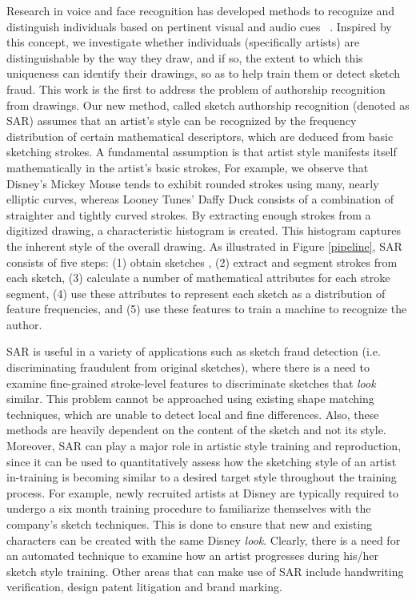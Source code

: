 Research in voice and face recognition has developed methods to recognize and distinguish individuals based on pertinent visual and audio cues ~\cite{tolba2006face}. Inspired by this concept, we investigate whether individuals (specifically artists) are distinguishable by the way they draw, and if so, the extent to which this uniqueness can identify their drawings, so as to help train them or detect sketch fraud. This work is the first to address the problem of authorship recognition from drawings. Our new method, called sketch authorship recognition (denoted as SAR) assumes that an artist's style can be recognized by the frequency distribution of certain mathematical descriptors, which are deduced from basic sketching strokes. A fundamental assumption is that artist style manifests itself mathematically in the artist's basic strokes, For example, we observe that Disney's Mickey Mouse tends to exhibit rounded strokes using many, nearly elliptic curves, whereas Looney Tunes' Daffy Duck consists of a combination of straighter and tightly curved strokes. By extracting enough strokes from a digitized drawing, a characteristic histogram is created. This histogram captures the inherent style of the overall drawing. As illustrated in Figure \ref{pipeline}, SAR consists of five steps: (1) obtain sketches , (2) extract and segment strokes from each sketch, (3) calculate a number of mathematical attributes for each stroke segment, (4) use these attributes to represent each sketch as a distribution of feature frequencies, and (5) use these features to train a machine to recognize the author.

\vspace{-1mm}
SAR is useful in a variety of applications such as sketch fraud detection (i.e. discriminating fraudulent from original sketches), where there is a need to examine fine-grained stroke-level features to discriminate sketches that \emph{look} similar. This problem cannot be approached using existing shape matching techniques, which are unable to detect local and fine differences. Also, these methods are heavily dependent on the content of the sketch and not its style. Moreover, SAR can play a major role in artistic style training and reproduction, since it can be used to quantitatively assess how the sketching style of an artist in-training is becoming similar to a desired target style throughout the training process. For example, newly recruited artists at Disney are typically required to undergo a six month training procedure to familiarize themselves with the company's sketch techniques. This is done to ensure that new and existing characters can be created with the same Disney \emph{look}. Clearly, there is a need for an automated technique to examine how an artist progresses during his/her sketch style training. Other areas that can make use of SAR include handwriting verification, design patent litigation and brand marking.

